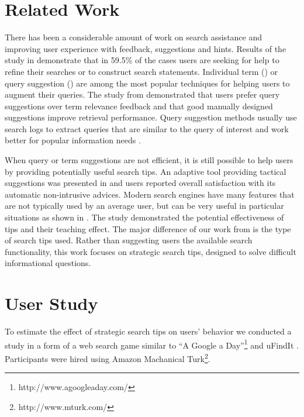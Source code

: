 \documentclass{sig-alternate}
\begin{document}
\section{Related Work}

There has been a considerable amount of work on search assistance and improving user experience with feedback, suggestions and hints.
Results of the study in \cite{xie2009understanding} demonstrate that in 59.5\% of the cases users are seeking for help to refine their searches or to construct search statements.
Individual term (\cite{ruthven2003survey}) or query suggestion (\cite{Bhatia:2011:QSA:2009916.2010023, Cao:2008:CQS:1401890.1401995,Jones:2006:GQS:1135777.1135835}) are among the most popular techniques for helping users to augment their queries.
The study from \cite{Kelly:2009:CQT:1571941.1572006} demonstrated that users prefer query suggestions over term relevance feedback and that good manually designed suggestions improve retrieval performance.
Query suggestion methods usually use search logs to extract queries that are similar to the query of interest and work better for popular information needs \cite{Bhatia:2011:QSA:2009916.2010023}.

When query or term suggestions are not efficient, it is still possible to help users by providing potentially useful search tips.
An adaptive tool providing tactical suggestions was presented in \cite{Kriewel2010} and users reported overall satisfaction with its automatic non-intrusive advices.
Modern searc\setlength{\floatsep}{3pt plus 1.0pt minus 1.0pt}h engines have many features that are not typically used by an average user, but can be very useful in particular situations as shown in \cite{Moraveji:2011:MIU:2009916.2009966}. The study demonstrated the potential effectiveness of tips and their teaching effect.
The major difference of our work from \cite{Moraveji:2011:MIU:2009916.2009966} is the type of search tips used.
Rather than suggesting users the available search functionality, this work focuses on strategic search tips, designed to solve difficult informational questions.

\section{User Study}

To estimate the effect of strategic search tips on users' behavior we conducted a study in a form of a web search game similar to ``A Google a Day''\footnote{http://www.agoogleaday.com/} and uFindIt \cite{Ageev:2011:FYG:2009916.2009965}. Participants were hired using Amazon Machanical Turk\footnote{http://www.mturk.com/}. 
\end{document}
